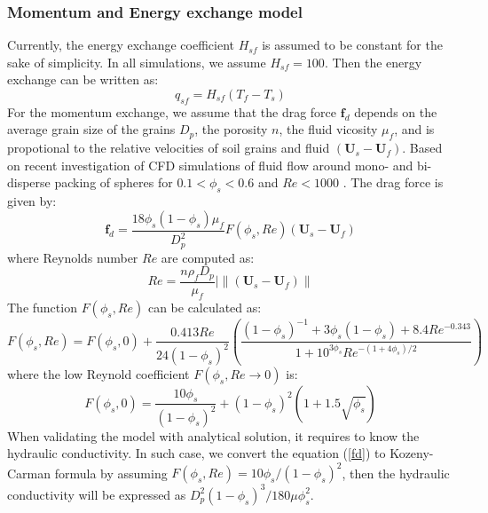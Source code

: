 \documentclass[preprint,12pt]{elsarticle}
\begin{document}
\subsubsection{Momentum and Energy exchange model}
Currently, the energy exchange coefficient $H_{sf}$ is assumed to be constant for the sake of simplicity. In all simulations, we assume $H_{sf}=100$.  Then the energy exchange can be written as:
%
%
\begin{equation}
     q_{sf} = H_{sf} (T_f -T_s)
\end {equation}
%
%
For the momentum exchange, we assume that the drag force $\pmb{f}_{d}$ depends on the average grain size of the grains $D_p$, the porosity $n$, the fluid vicosity $\mu_f$, and is propotional to the relative velocities of soil grains and fluid $(\pmb{U}_s - \pmb{U}_f)$. Based on recent investigation of CFD simulations of fluid flow around mono- and bi-disperse packing of spheres for $0.1 < \phi_s < 0.6$ and $Re < 1000$ \cite{Drag}. The drag force is given by: \\
%
%
\begin{equation}
     \pmb{f}_{d} = \frac{18\phi_s(1-\phi_s)\mu_f}{D_p^2} F(\phi_s, Re) (\pmb{U}_s - \pmb{U}_f)  
\label{fd}
\end {equation}
%
%
where Reynolds number $Re$ are computed as:
%
%
\begin{equation}
     Re = \frac{n \rho_f D_p}{\mu_f} |\big\|(\pmb{U}_s - \pmb{U}_f)\big\|
\end {equation}
%
%
The function $F(\phi_s, Re)$ can be calculated as:
%
%
\begin{equation}
     F(\phi_s, Re)  = F(\phi_s, 0)  + \frac{0.413Re}{24 (1-\phi_s)^2} (\frac{(1-\phi_s)^{-1}+3\phi_s(1-\phi_s)+8.4Re^{-0.343}}{1+10^{3\phi_s}Re^{-(1+4\phi_s)/2}})
\end {equation}
%
%
where the low Reynold coefficient $ F(\phi_s, Re\rightarrow0)$ is:
%
%
\begin{equation}
     F(\phi_s, 0)  = \frac{10\phi_s}{ (1-\phi_s)^2}+(1-\phi_s)^2(1+1.5\sqrt{\phi_s})
\end {equation}
%
%
When validating the model with analytical solution, it requires to know the hydraulic conductivity. In such case, we convert the equation (\ref{fd}) to Kozeny-Carman formula by assuming $F(\phi_s, Re) = 10\phi_s/(1-\phi_s)^2$, then the hydraulic conductivity will be expressed as  $D_p^2 (1-\phi_s)^3 / 180 \mu \phi_s^2$.
\end{document}
